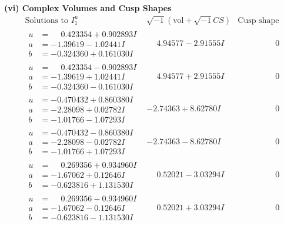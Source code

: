 \documentclass[1p]{elsarticle_modified}
\theoremstyle{definition}
\newcommand{\I}{\sqrt{-1}}
\begin{document}
\newpage\flushleft \textbf{(vi) Complex Volumes and Cusp Shapes}
$$\begin{array}{c|c|c}  
\text{Solutions to }I^u_{1}& \I (\text{vol} + \sqrt{-1}CS) & \text{Cusp shape}\\
 \hline 
\begin{aligned}
u &= \phantom{-}0.423354 + 0.902893 I \\
a &= -1.39619 - 1.02441 I \\
b &= -0.324360 + 0.161030 I\end{aligned}
 & \phantom{-}4.94577 - 2.91555 I & \phantom{-0.000000 } 0 \\ \hline\begin{aligned}
u &= \phantom{-}0.423354 - 0.902893 I \\
a &= -1.39619 + 1.02441 I \\
b &= -0.324360 - 0.161030 I\end{aligned}
 & \phantom{-}4.94577 + 2.91555 I & \phantom{-0.000000 } 0 \\ \hline\begin{aligned}
u &= -0.470432 + 0.860380 I \\
a &= -2.28098 + 0.02782 I \\
b &= -1.01766 - 1.07293 I\end{aligned}
 & -2.74363 + 8.62780 I & \phantom{-0.000000 } 0 \\ \hline\begin{aligned}
u &= -0.470432 - 0.860380 I \\
a &= -2.28098 - 0.02782 I \\
b &= -1.01766 + 1.07293 I\end{aligned}
 & -2.74363 - 8.62780 I & \phantom{-0.000000 } 0 \\ \hline\begin{aligned}
u &= \phantom{-}0.269356 + 0.934960 I \\
a &= -1.67062 + 0.12646 I \\
b &= -0.623816 + 1.131530 I\end{aligned}
 & \phantom{-}0.52021 - 3.03294 I & \phantom{-0.000000 } 0 \\ \hline\begin{aligned}
u &= \phantom{-}0.269356 - 0.934960 I \\
a &= -1.67062 - 0.12646 I \\
b &= -0.623816 - 1.131530 I\end{aligned}
 & \phantom{-}0.52021 + 3.03294 I & \phantom{-0.000000 } 0 \\ \hline\begin{aligned}

\end{aligned}
\end{array}$$
\end{document}
